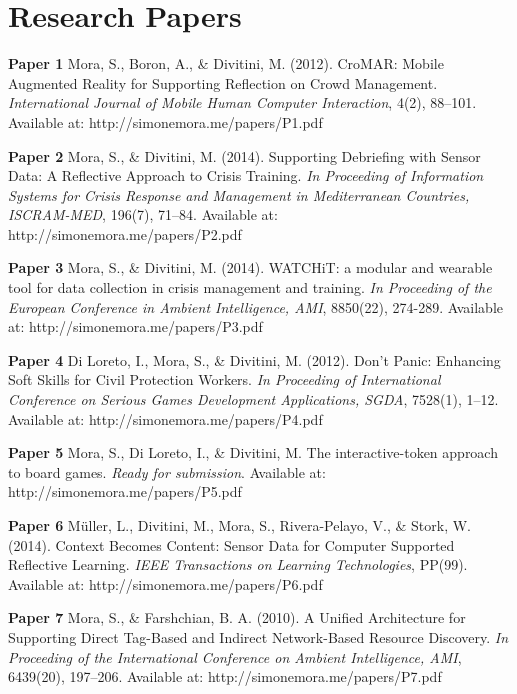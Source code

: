 \appendix

\chapter{Research Papers}\label{papers}

\textbf{Paper 1} Mora, S., Boron, A., \& Divitini, M. (2012). CroMAR:
Mobile Augmented Reality for Supporting Reflection on Crowd Management.
\emph{International Journal of Mobile Human Computer Interaction}, 4(2),
88--101. Available at: http://simonemora.me/papers/P1.pdf

\textbf{Paper 2} Mora, S., \& Divitini, M. (2014). Supporting Debriefing
with Sensor Data: A Reflective Approach to Crisis Training. \emph{In
Proceeding of Information Systems for Crisis Response and Management in
Mediterranean Countries, ISCRAM-MED}, 196(7), 71--84. Available at:
http://simonemora.me/papers/P2.pdf

\textbf{Paper 3} Mora, S., \& Divitini, M. (2014). WATCHiT: a modular
and wearable tool for data collection in crisis management and training.
\emph{In Proceeding of the European Conference in Ambient Intelligence,
AMI}, 8850(22), 274-289. Available at:
http://simonemora.me/papers/P3.pdf

\textbf{Paper 4} Di Loreto, I., Mora, S., \& Divitini, M. (2012). Don't
Panic: Enhancing Soft Skills for Civil Protection Workers. \emph{In
Proceeding of International Conference on Serious Games Development
Applications, SGDA}, 7528(1), 1--12. Available at:
http://simonemora.me/papers/P4.pdf

\textbf{Paper 5} Mora, S., Di Loreto, I., \& Divitini, M. The
interactive-token approach to board games. \emph{Ready for submission}.
Available at: http://simonemora.me/papers/P5.pdf

\textbf{Paper 6} Müller, L., Divitini, M., Mora, S., Rivera-Pelayo, V.,
\& Stork, W. (2014). Context Becomes Content: Sensor Data for Computer
Supported Reflective Learning. \emph{IEEE Transactions on Learning
Technologies}, PP(99). Available at: http://simonemora.me/papers/P6.pdf

\textbf{Paper 7} Mora, S., \& Farshchian, B. A. (2010). A Unified
Architecture for Supporting Direct Tag-Based and Indirect Network-Based
Resource Discovery. \emph{In Proceeding of the International Conference
on Ambient Intelligence, AMI}, 6439(20), 197--206. Available at:
http://simonemora.me/papers/P7.pdf

